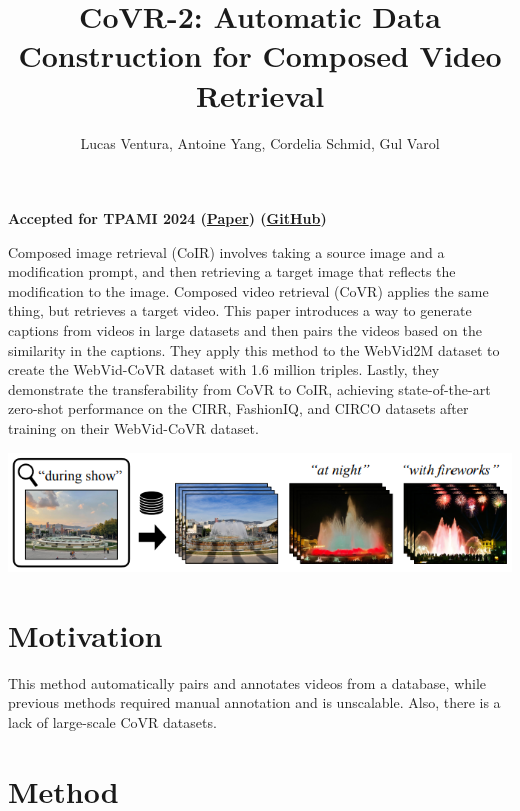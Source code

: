 \documentclass{article}
\title{CoVR-2: Automatic Data Construction for Composed Video Retrieval}
\author{Lucas Ventura, Antoine Yang, Cordelia Schmid, Gul Varol}
\date{}
\begin{document}
\maketitle

\begin{center}\textbf{Accepted for TPAMI 2024 (\href{https://arxiv.org/pdf/2308.14746}{Paper}) (\href{https://github.com/lucas-ventura/CoVR}{GitHub})}\end{center}

Composed image retrieval (CoIR) involves taking a source image and a modification prompt, and then retrieving a target image that reflects the modification to the image. Composed video retrieval (CoVR) applies the same thing, but retrieves a target video. This paper introduces a way to generate captions from videos in large datasets and then pairs the videos based on the similarity in the captions. They apply this method to the WebVid2M dataset to create the WebVid-CoVR dataset with 1.6 million triples. Lastly, they  demonstrate the transferability from CoVR to CoIR, achieving state-of-the-art zero-shot performance on the CIRR, FashionIQ, and CIRCO datasets after training on their WebVid-CoVR dataset.

\begin{center}
    \includegraphics[scale=0.7]{covr2-1.png}
\end{center}

\section*{Motivation}

This method automatically pairs and annotates videos from a database, while previous methods required manual annotation and is unscalable. Also, there is a lack of large-scale CoVR datasets.

\section*{Method}
\end{document}

